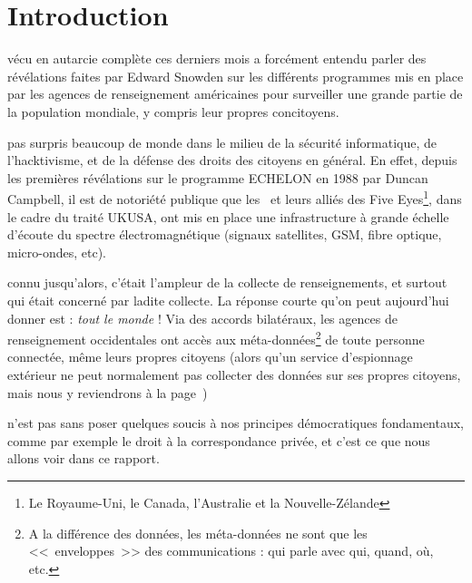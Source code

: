 \chapter{Introduction}
\label{ch:intro}

 vécu en autarcie complète ces derniers
mois a forcément entendu parler des révélations faites par Edward Snowden sur les
différents programmes mis en place par les agences de renseignement américaines
pour surveiller une grande partie de la population mondiale, y compris leur
propres concitoyens.

 pas surpris beaucoup de monde dans le milieu
de la sécurité informatique, de l'hacktivisme, et de la défense des droits des
citoyens en général. En effet, depuis les premières révélations sur le
programme ECHELON en 1988 par Duncan Campbell\cite{Campbell1988}, il est de
notoriété publique que les \EUA~et leurs alliés des Five Eyes\footnote{Le
Royaume-Uni, le Canada, l’Australie et la Nouvelle-Zélande}, dans le cadre du
traité UKUSA, ont mis en place une infrastructure à grande échelle d'écoute du
spectre électromagnétique (signaux satellites, GSM, fibre optique, micro-ondes,
etc). 

 connu jusqu'alors, c'était l'ampleur de la
collecte de renseignements, et surtout qui était concerné par ladite collecte.
La réponse courte qu'on peut aujourd'hui donner est : \emph{tout le monde} ! Via
des accords bilatéraux, les agences de renseignement occidentales ont accès aux
méta-données\footnote{A la différence des données, les méta-données ne
sont que les <<~enveloppes~>> des communications : qui parle avec qui,
quand, où, etc.} de toute personne connectée, même leurs propres citoyens
(alors qu'un service d'espionnage extérieur ne peut normalement pas collecter
des données sur ses propres citoyens, mais nous y reviendrons à la
page~\pageref{impact})

 n'est pas sans poser quelques soucis à nos
principes démocratiques fondamentaux, comme par exemple le droit à la correspondance
privée\cite{CEDH}, et c'est ce que nous allons voir dans ce rapport.
